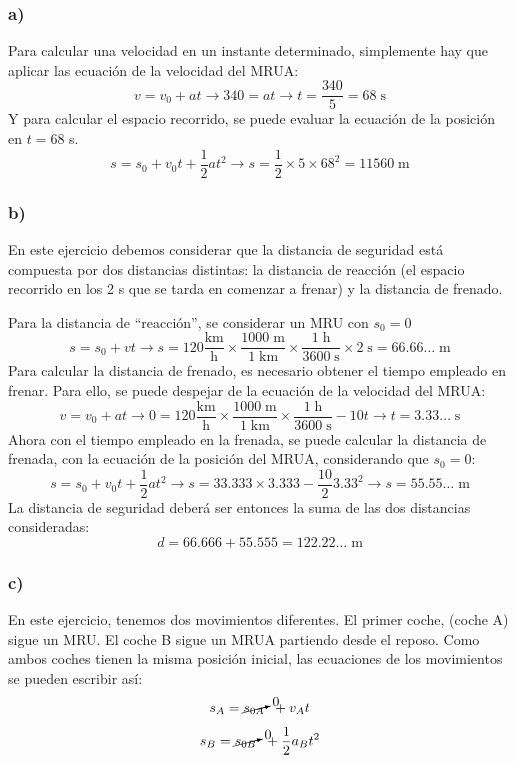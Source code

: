 \documentclass[ %
    oneside,    %
    10pt        %
]{apuntes} %
\begin{document}
\begin{examplebox}
	\subsubsection*{a)}
	Para calcular una velocidad en un instante determinado, simplemente hay que aplicar las ecuación de la velocidad del MRUA:
	\[v = v_0 + a t \to 340 = a t \to t = \frac{340}{5} = 68 \; \text{s}\]
	Y para calcular el espacio recorrido, se puede evaluar la ecuación de la posición en $t = 68$ s.
	\[s = s_0 + v_0 t + \frac1{2}a t^2 \to s = \frac1{2}\times5\times68^2 = 11560 \;\text{m}\]

	\subsubsection*{b)}
	En este ejercicio debemos considerar que la distancia de seguridad está compuesta por dos distancias distintas: la distancia de reacción (el espacio recorrido en los 2 s que se tarda en comenzar a frenar) y la distancia de frenado.
	\par Para la distancia de ``reacción'', se considerar un MRU con $s_0 = 0$
	\[s = s_0 + v t \to s = 120 \frac{\text{km}}{\text{h}}\times\frac{1000\;\text{m}}{1\;\text{km}}\times \frac{1\;\text{h}}{{3600\;\text{s}}} \times 2 \;\text{s} = 66.66\dots \; \text{m}\]
	Para calcular la distancia de frenado, es necesario obtener el tiempo empleado en frenar. Para ello, se puede despejar de la ecuación de la velocidad del MRUA:
	\[v = v_0 + at \to 0 = 120\frac{\text{km}}{\text{h}}\times\frac{1000\;\text{m}}{1\;\text{km}}\times \frac{1\;\text{h}}{{3600\;\text{s}}}- 10t \to t = 3.33\dots \; \text{s}\]
	Ahora con el tiempo empleado en la frenada, se puede calcular la distancia de frenada, con la ecuación de la posición del MRUA, considerando que $s_0 = 0$:
	\[ s = s_0 + v_0 t + \frac1{2} a t^2 \to s = 33.333\times3.333 - \frac{10}{2}3.33^2 \to s = 55.55\dots \; \text{m} \]
	La distancia de seguridad deberá ser entonces la suma de las dos distancias consideradas:
	\[d = 66.666 + 55.555 = 122.22\dots \; \text{m}\]

	\subsubsection*{c)}
	En este ejercicio, tenemos dos movimientos diferentes. El primer coche, (coche A) sigue un MRU. El coche B sigue un MRUA partiendo desde el reposo. Como ambos coches tienen la misma posición inicial, las ecuaciones de los movimientos se pueden escribir así:
	\[ s_A = \cancelto{0}{s_{0A}} \;\; + v_A t\]
	\[ s_B = \cancelto{0}{s_{0B}} \;\; + \frac1{2}a_B t^2\]


\end{examplebox}
\end{document}
